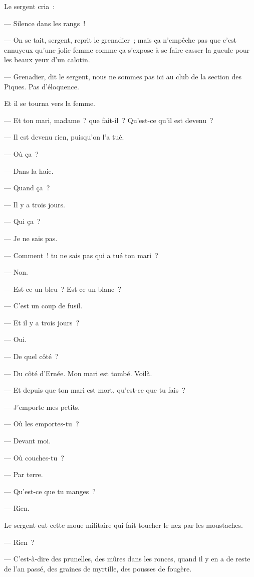\documentclass[french,twoside]{book} %
\begin{document}
Le sergent cria :\par
— Silence dans les rangs !\par
— On se tait, sergent, reprit le grenadier ; mais ça n’empêche pas que c’est ennuyeux qu’une jolie femme comme ça s’expose à se faire casser la gueule pour les beaux yeux d’un calotin.\par
— Grenadier, dit le sergent, nous ne sommes pas ici au club de la section des Piques. Pas d’éloquence.\par
Et il se tourna vers la femme.\par
— Et ton mari, madame ? que fait-il ? Qu’est-ce qu’il est devenu ?\par
— Il est devenu rien, puisqu’on l’a tué.\par
— Où ça ?\par
— Dans la haie.\par
— Quand ça ?\par
— Il y a trois jours.\par
— Qui ça ?\par
— Je ne sais pas.\par
— Comment ! tu ne sais pas qui a tué ton mari ?\par
— Non.\par
 — Est-ce un bleu ? Est-ce un blanc ?\par
— C’est un coup de fusil.\par
— Et il y a trois jours ?\par
— Oui.\par
— De quel côté ?\par
— Du côté d’Ernée. Mon mari est tombé. Voilà.\par
— Et depuis que ton mari est mort, qu’est-ce que tu fais ?\par
— J’emporte mes petits.\par
— Où les emportes-tu ?\par
— Devant moi.\par
— Où couches-tu ?\par
— Par terre.\par
— Qu’est-ce que tu manges ?\par
— Rien.\par
Le sergent eut cette moue militaire qui fait toucher le nez par les moustaches.\par
— Rien ?\par
— C’est-à-dire des prunelles, des mûres dans les ronces, quand il y en a de reste de l’an passé, des graines de myrtille, des pousses de fougère.\par
\end{document}
